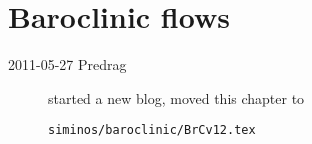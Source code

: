 
\chapter{Baroclinic flows}
\label{chap:baroclinic}

\begin{description}
\item[2011-05-27 Predrag]
started a new blog, moved this chapter to

\texttt{siminos/baroclinic/BrCv12.tex}

\end{description}

